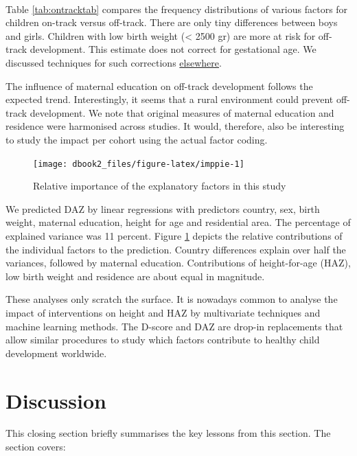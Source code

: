 \documentclass[
]{book}
\begin{document}
~

Table \ref{tab:ontracktab} compares the frequency distributions of various factors for children on-track versus off-track. There are only tiny differences between boys and girls. Children with low birth weight (\textless{} 2500 gr) are more at risk for off-track development. This estimate does not correct for gestational age. We discussed techniques for such corrections \href{https://d-score.org/dbook1/sec-pops.html}{elsewhere}.

The influence of maternal education on off-track development follows the expected trend. Interestingly, it seems that a rural environment could prevent off-track development. We note that original measures of maternal education and residence were harmonised across studies. It would, therefore, also be interesting to study the impact per cohort using the actual factor coding.

\begin{figure}

{\centering \texttt{[image: dbook2\_files/figure-latex/imppie-1]} 

}

\caption{Relative importance of the explanatory factors in this study}\label{fig:imppie}
\end{figure}



We predicted DAZ by linear regressions with predictors country, sex, birth weight, maternal education, height for age and residential area. The percentage of explained variance was 11 percent. Figure \ref{fig:imppie} depicts the relative contributions of the individual factors to the prediction. Country differences explain over half the variances, followed by maternal education. Contributions of height-for-age (HAZ), low birth weight and residence are about equal in magnitude.

These analyses only scratch the surface. It is nowadays common to analyse the impact of interventions on height and HAZ by multivariate techniques and machine learning methods. The D-score and DAZ are drop-in replacements that allow similar procedures to study which factors contribute to healthy child development worldwide.

\hypertarget{ch:discussion2}{%
\chapter{Discussion}\label{ch:discussion2}}

This closing section briefly summarises the key lessons from this section. The section covers:
\end{document}
